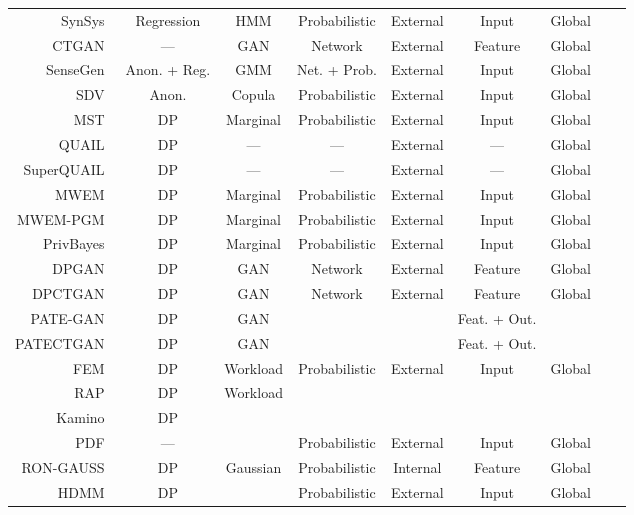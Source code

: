 \documentclass[parskip=full]{scrartcl}
\begin{document}
\begin{longtable}{rcccccccc}
    \bottomrule
    \endlastfoot
      SynSys~\cite{dahmen2019synsys} & Regression & HMM & Probabilistic & External & Input & Global \\
      CTGAN~\cite{xu2019modeling} & --- & GAN & Network & External & Feature & Global \\
      SenseGen~\cite{alzantot2017sensegen} & Anon. + Reg. & GMM & Net. + Prob. & External & Input & Global \\
      SDV~\cite{patki2016synthetic} & Anon. & Copula & Probabilistic & External & Input & Global \\
      MST~\cite{mckenna2021winning} & DP & Marginal & Probabilistic & External & Input & Global \\
      QUAIL~\cite{rosenblatt2020differentially} & DP & --- & --- & External & --- & Global \\
      SuperQUAIL~\cite{rosenblatt2022spending} & DP & --- & --- & External & --- & Global \\
      MWEM~\cite{hardt2012simple} & DP & Marginal & Probabilistic & External & Input & Global \\
      MWEM-PGM~\cite{mckenna2019graphical} & DP & Marginal & Probabilistic & External & Input & Global \\
      PrivBayes~\cite{zhang2017privbayes} & DP & Marginal & Probabilistic & External & Input & Global \\
      DPGAN~\cite{xie2018differentially} & DP & GAN & Network & External & Feature & Global \\
      DPCTGAN~\cite{rosenblatt2020differentially} & DP & GAN &  Network & External & Feature & Global \\
      PATE-GAN~\cite{jordon2018pate} & DP & GAN & & & Feat. + Out.\\
      PATECTGAN~\cite{rosenblatt2020differentially} & DP & GAN & & & Feat. + Out.\\
      FEM~\cite{vietri2020new} & DP & Workload & Probabilistic & External & Input & Global \\
      RAP~\cite{aydore2021differentially} & DP & Workload \\
      Kamino~\cite{ge2021kamino} & DP \\
      PDF~\cite{de2019formal, suciu2011probabilistic} & --- &  & Probabilistic & External & Input & Global \\
      RON-GAUSS~\cite{chanyaswad2019ron} & DP & Gaussian & Probabilistic & Internal & Feature & Global \\
      HDMM~\cite{mckenna2018optimizing} & DP &  & Probabilistic & External & Input & Global \\

\end{longtable}
\end{document}
